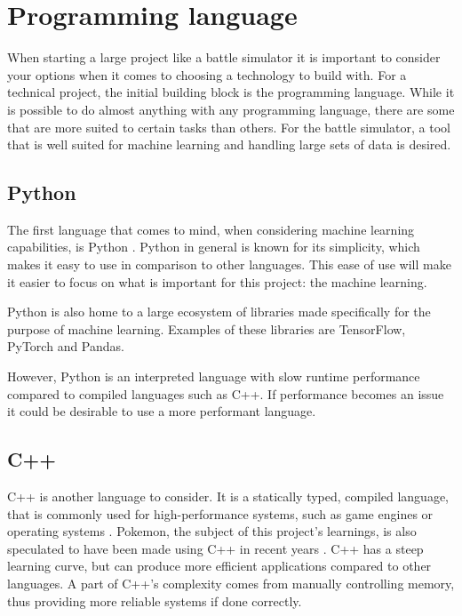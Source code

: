 \section{Programming language}
\label{sec:choice-of-language}

When starting a large project like a battle simulator it is important to consider your options when it comes to choosing a technology to build with.
For a technical project, the initial building block is the programming language. While it is possible to do almost anything with any 
programming language, there are some that are more suited to certain tasks than others. For the battle simulator, a tool that is well 
suited for machine learning and handling large sets of data is desired.

\subsection{Python}
The first language that comes to mind, when considering machine learning capabilities, is Python \cite{PythonForMachineLearning}.
Python in general is known for its simplicity, which makes it easy to use in comparison to other languages. This ease of use will make it
easier to focus on what is important for this project: the machine learning.

Python is also home to a large ecosystem of libraries made specifically for the purpose of machine learning. Examples of these libraries are
TensorFlow, PyTorch and Pandas.

However, Python is an interpreted language with slow runtime performance compared to compiled languages such as C++. 
If performance becomes an issue it could be desirable to use a more performant language.


\subsection{C++}
C++ is another language to consider. It is a statically typed, compiled language, that is commonly used for high-performance systems, such as
game engines or operating systems \cite{C++}. Pokemon, the subject of this project's learnings, is also speculated to have been made using C++ in recent years \cite{PokemonProgrammingLanguageForumPost}\cite{NintendoDataLeak}\cite{ChatGPTPokemonProgrammingLanguage}.
C++ has a steep learning curve, but can produce more efficient applications compared to other languages. 
A part of C++'s complexity comes from manually controlling memory, thus providing more reliable systems if done correctly. 

